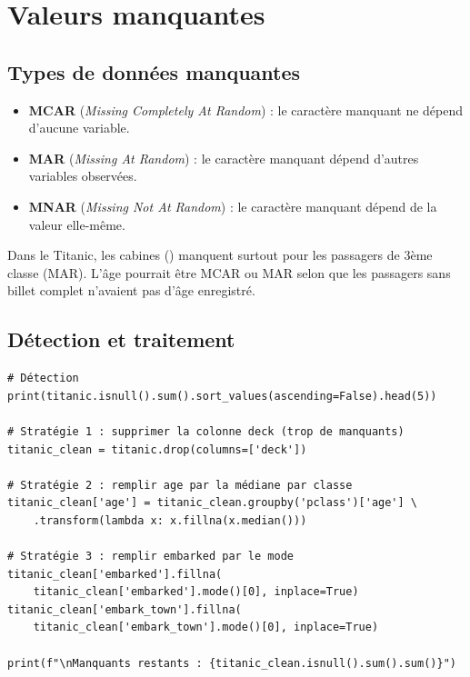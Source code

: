 \section{Valeurs manquantes}

\subsection{Types de donn\'ees manquantes}

\begin{definition}
\begin{itemize}
    \item \textbf{MCAR} (\emph{Missing Completely At Random}) : le caract\`ere manquant ne d\'epend d'aucune variable.
    \item \textbf{MAR} (\emph{Missing At Random}) : le caract\`ere manquant d\'epend d'autres variables observ\'ees.
    \item \textbf{MNAR} (\emph{Missing Not At Random}) : le caract\`ere manquant d\'epend de la valeur elle-m\^eme.
\end{itemize}
\end{definition}

\begin{exemple}
Dans le Titanic, les cabines () manquent surtout pour les passagers de 3\`eme classe (MAR). L'\^age pourrait \^etre MCAR ou MAR selon que les passagers sans billet complet n'avaient pas d'\^age enregistr\'e.
\end{exemple}

\subsection{D\'etection et traitement}

\begin{codeblock}[title=\textbf{Python}]
\begin{verbatim}
# Détection
print(titanic.isnull().sum().sort_values(ascending=False).head(5))

# Stratégie 1 : supprimer la colonne deck (trop de manquants)
titanic_clean = titanic.drop(columns=['deck'])

# Stratégie 2 : remplir age par la médiane par classe
titanic_clean['age'] = titanic_clean.groupby('pclass')['age'] \
    .transform(lambda x: x.fillna(x.median()))

# Stratégie 3 : remplir embarked par le mode
titanic_clean['embarked'].fillna(
    titanic_clean['embarked'].mode()[0], inplace=True)
titanic_clean['embark_town'].fillna(
    titanic_clean['embark_town'].mode()[0], inplace=True)

print(f"\nManquants restants : {titanic_clean.isnull().sum().sum()}")
\end{verbatim}
\end{codeblock}

